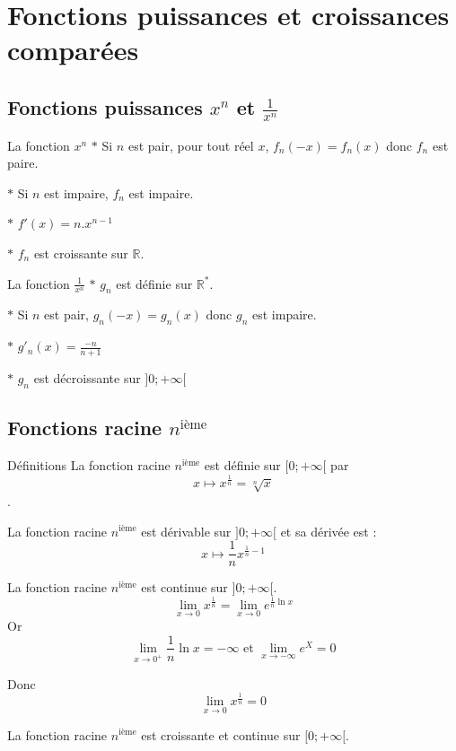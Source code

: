 \section{Fonctions puissances et croissances comparées}
\subsection{Fonctions puissances $x^n$ et $\frac{1}{x^n}$}
\begin{bclogo}{La fonction $x^n$}
$\ast$ Si $n$ est pair, pour tout réel $x$, $f_n(-x)=f_n(x)$ donc $f_n$ est paire.

$\ast$ Si $n$ est impaire, $f_n$ est impaire.

$\ast$ $f'(x)=n.x^{n-1}$

$\ast$ $f_n$ est croissante sur $\mathbb{R}$.
\end{bclogo}

\newpage

\begin{bclogo}{La fonction $\frac{1}{x^n}$}
$\ast$ $g_n$ est définie sur $\mathbb{R}^*$.

$\ast$ Si $n$ est pair, $g_n(-x)=g_n(x)$ donc $g_n$ est impaire.

$\ast$ $g'_n(x)=\frac{-n}{n+1}$

$\ast$ $g_n$ est décroissante sur $]0;+\infty [$
\end{bclogo}

\subsection{Fonctions racine $n^{\text{ième}}$}
\begin{bclogo}{Définitions}
La fonction racine $n^{\text{ième}}$ est définie sur $[0;+\infty[$ par \[x\mapsto x^{\frac{1}{n}}=\sqrt[n]{x}\].

La fonction racine $n^{\text{ième}}$ est dérivable sur $]0;+\infty[$ et sa dérivée est : \[x\mapsto \frac{1}{n}x^{\frac{1}{n}-1}\]

La fonction racine $n^{\text{ième}}$ est continue sur $]0;+\infty[$. 
\[\lim\limits_{x \to 0} x^{\frac{1}{n}}= \lim\limits_{x \to 0} e^{\frac{1}{n}\ln x}\]
Or 
\[\lim\limits_{x \to 0^+} \frac{1}{n} \ln x=-\infty \text{ et } \lim\limits_{x \to -\infty} e^X=0\]

Donc
\[\lim\limits_{x \to 0} x^{\frac{1}{n}}=0\]

La fonction racine $n^{\text{ième}}$ est croissante et continue sur $[0;+\infty[$.
\end{bclogo}

